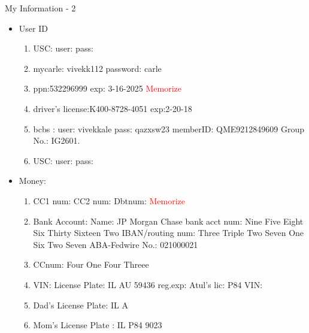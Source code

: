         \begin{frame}{My Information - 2}
        \begin{itemize}
        \conti 
 \tiny  \item \tiny  User ID
        \begin{enumerate}
        \item \tiny USC:  user:   pass: 
      \item \tiny mycarle: vivekk112 password: carle
      \item \tiny ppn:532296999 exp: 3-16-2025  \textcolor{red}{Memorize} 
      	\item \tiny driver's license:K400-8728-4051 exp:2-20-18
          \tiny \item \tiny bcbs : user: vivekkale pass: qazxsw23 memberID: QME9212849609  Group No.: IG2601.
        \item \tiny USC:  user:   pass: 
        \end{enumerate}
      \item \tiny Money:
        \begin{enumerate}
          \tiny \item \tiny CC1 num: CC2 num: Dbtnum:  \textcolor{red}{Memorize} 
        \item \tiny Bank Account:
          Name: JP Morgan Chase
          bank acct num: Nine Five Eight Six Thirty Sixteen Two
          IBAN/routing num: Three Triple Two Seven One Six Two Seven 
          ABA-Fedwire No.: 021000021
        \item \tiny CCnum: Four One Four Threee
        \item \tiny VIN:  License Plate: IL AU 59436 reg.exp:   Atul's lic: P84 VIN:
        \item \tiny Dad's License Plate: IL A
        \item \tiny Mom's License Plate : IL P84 9023 
        \end{enumerate}
        \seti
        \end{itemize}
        \end{frame}
